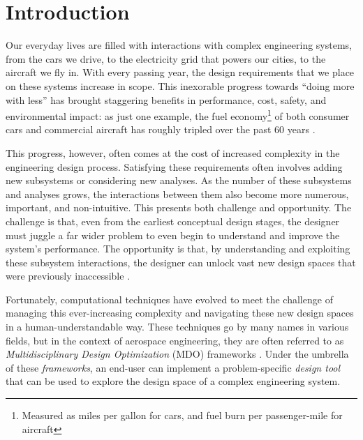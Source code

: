 \chapter{Introduction}
\label{chap:intro}


Our everyday lives are filled with interactions with complex engineering systems, from the cars we drive, to the electricity grid that powers our cities, to the aircraft we fly in. With every passing year, the design requirements that we place on these systems increase in scope. This inexorable progress towards ``doing more with less'' has brought staggering benefits in performance, cost, safety, and environmental impact: as just one example, the fuel economy\footnote{Measured as miles per gallon for cars, and fuel burn per passenger-mile for aircraft} of both consumer cars and commercial aircraft has roughly tripled over the past 60 years \cite{EPA_Automotive_Trends_2023, drela_tedx}.

This progress, however, often comes at the cost of increased complexity in the engineering design process. Satisfying these requirements often involves adding new subsystems or considering new analyses. As the number of these subsystems and analyses grows, the interactions between them also become more numerous, important, and non-intuitive. This presents both challenge and opportunity. The challenge is that, even from the earliest conceptual design stages, the designer must juggle a far wider problem to even begin to understand and improve the system's performance. The opportunity is that, by understanding and exploiting these subsystem interactions, the designer can unlock vast new design spaces that were previously inaccessible \cite{drela_design_2011}.

Fortunately, computational techniques have evolved to meet the challenge of managing this ever-increasing complexity and navigating these new design spaces in a human-understandable way. These techniques go by many names in various fields, but in the context of aerospace engineering, they are often referred to as \emph{Multidisciplinary Design Optimization} (MDO) frameworks \cite{martins_multidisciplinary_2013}. Under the umbrella of these \emph{frameworks}, an end-user can implement a problem-specific \emph{design tool} that can be used to explore the design space of a complex engineering system.

